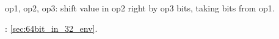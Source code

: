 \item[SHRD] op1, op2, op3: 
{shift value in op2 right by op3 bits, taking bits from op1}.


: \ref{sec:64bit_in_32_env}.
